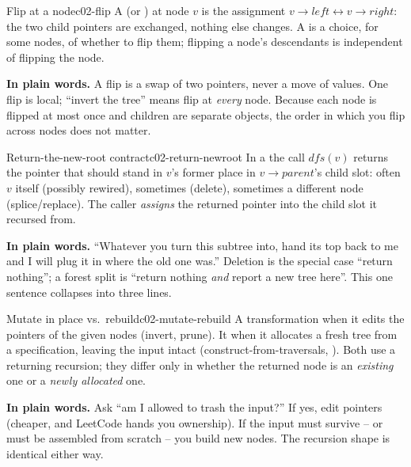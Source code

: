 \begin{definition}{Flip at a node}{c02-flip}
A  (or ) at node $v$ is the assignment
$v\to\mathit{left} \leftrightarrow v\to\mathit{right}$: the two child pointers are
exchanged, nothing else changes. A  is a choice, for some nodes, of
whether to flip them; flipping a node's descendants is independent of flipping the
node.
\end{definition}

\noindent\textbf{In plain words.} A flip is a swap of two pointers, never a move of
values. One flip is local; ``invert the tree'' means flip at \emph{every} node.
Because each node is flipped at most once and children are separate objects, the
order in which you flip across nodes does not matter.

\begin{definition}{Return-the-new-root contract}{c02-return-newroot}
In a  the call $\mathit{dfs}(v)$ returns the pointer
that should stand in $v$'s former place in $v\!\to\!\mathit{parent}$'s child slot:
often $v$ itself (possibly rewired), sometimes  (delete), sometimes a
different node (splice/replace). The caller \emph{assigns} the returned pointer into
the child slot it recursed from.
\end{definition}

\noindent\textbf{In plain words.} ``Whatever you turn this subtree into, hand its
top back to me and I will plug it in where the old one was.'' Deletion is the
special case ``return nothing''; a forest split is ``return nothing \emph{and}
report a new tree here''. This one sentence collapses 
into three lines.

\begin{definition}{Mutate in place vs.\ rebuild}{c02-mutate-rebuild}
A transformation  when it edits the pointers of the given
nodes (invert, prune). It  when it allocates a fresh tree from a
specification, leaving the input intact (construct-from-traversals, ).
Both use a returning recursion; they differ only in whether the returned node is
an \emph{existing} one or a \emph{newly allocated} one.
\end{definition}

\noindent\textbf{In plain words.} Ask ``am I allowed to trash the input?'' If yes,
edit pointers (cheaper, and LeetCode hands you ownership). If the input must
survive -- or must be assembled from scratch -- you build new nodes. The recursion
shape is identical either way.

